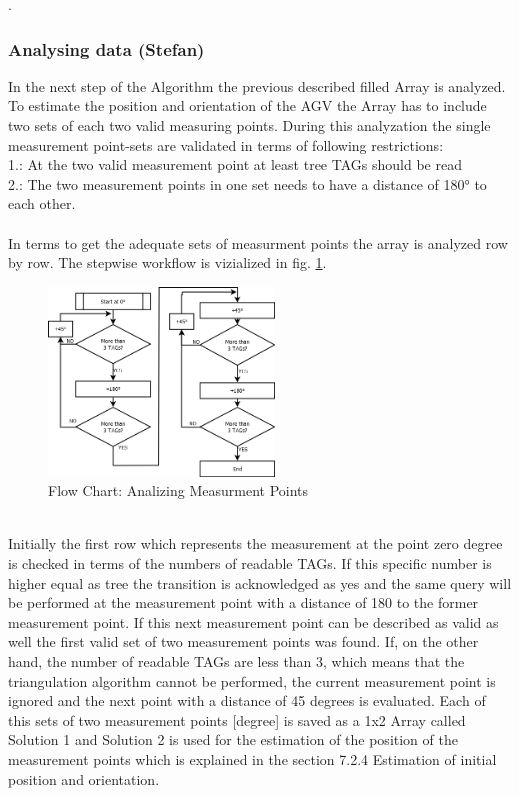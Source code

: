 .
\subsubsection{Analysing data (Stefan)}
In the next step of the Algorithm the previous described filled Array is analyzed. To estimate the position and orientation of the AGV the Array has to include two sets of each two valid measuring points.  During this analyzation the single measurement point-sets are validated in terms of following restrictions:\\
1.: At the two valid measurement point at least tree TAGs should be read\\
2.: The two measurement points in one set needs to have a distance of 180° to each other.\\
\\
In terms to get the adequate sets of measurment points the array is analyzed row by row. The stepwise workflow is vizialized in fig. \ref{Analyze_Array}.
\begin{figure}[!htbp]
\centering
\includegraphics[width = 6cm]{Pictures/AnalyzeArray}
\caption{Flow Chart: Analizing Measurment Points}
\label{Analyze_Array}
\end{figure}\\
Initially the first row which represents the measurement at the point zero degree is checked in terms of the numbers of readable TAGs. If this specific number is higher equal as tree the transition is acknowledged as yes and the same query will be performed at the measurement point with a distance of 180 to the former measurement point. If this next measurement point can be described as valid as well the first valid set of two measurement points was found. If, on the other hand, the number of readable TAGs are less than 3, which means that the triangulation algorithm cannot be performed, the current measurement point is ignored and the next point with a distance of 45 degrees is evaluated.
Each of this sets of two measurement points [degree] is saved as a 1x2 Array called Solution 1 and Solution 2 is used for the estimation of the position of the measurement points which is explained in the section 7.2.4 Estimation of initial position and orientation.\\
